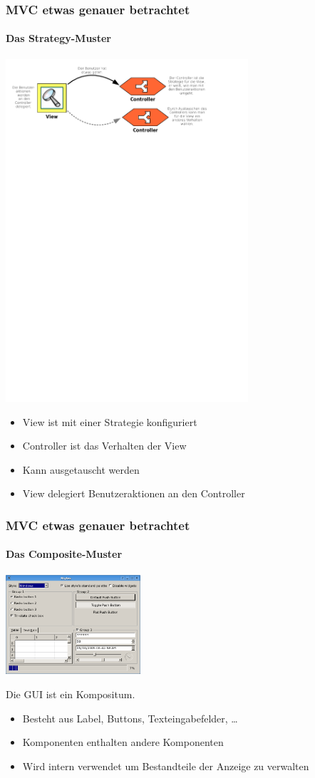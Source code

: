 \begin{frame}
	\frametitle{MVC etwas genauer betrachtet}
	\framesubtitle{Das Strategy-Muster}
	\begin{center}
	\includegraphics[trim = 0mm 227.7mm 28.6mm 0mm, clip, width=9cm]{../mvc/strategy-schema.pdf}
	\end{center}	
	\begin{itemize}
		\item View ist mit einer Strategie konfiguriert
		\item Controller ist das Verhalten der View
		\item Kann ausgetauscht werden
		\item View delegiert Benutzeraktionen an den Controller
	\end{itemize}
\end{frame}

\begin{frame}
	\frametitle{MVC etwas genauer betrachtet}
	\framesubtitle{Das Composite-Muster}
	\begin{center}
	\includegraphics[width=5cm]{gui.png}
	\end{center}	
	\begin{center}
		Die GUI ist ein Kompositum.
	\end{center}
	\begin{itemize}
		\item Besteht aus Label, Buttons, Texteingabefelder, \dots
		\item Komponenten enthalten andere Komponenten
		\item Wird intern verwendet um Bestandteile der Anzeige zu verwalten
	\end{itemize}
\end{frame}


